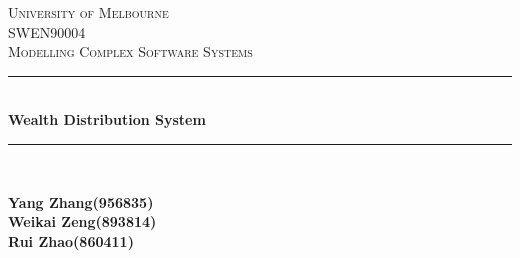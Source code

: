 \begin{titlepage}

\newcommand{\HRule}{\rule{\linewidth}{0.5mm}} %

\center %
 

\textsc{\LARGE University of Melbourne}\\[1.5cm] %
\textsc{\Large SWEN90004}\\[0.5cm] %
\textsc{\large Modelling Complex Software Systems}\\[0.5cm] %


\HRule \\[0.4cm]
{ \huge \bfseries Wealth Distribution System}\\[0.4cm] %
\HRule \\[1.5cm]


\begin{minipage}{0.4\textwidth}
	\centering
	\bfseries     Yang Zhang(956835)\\
	\bfseries     Weikai Zeng(893814) \\
	\bfseries     Rui Zhao(860411)\\
\end{minipage}\\[2cm]




\end{titlepage}
